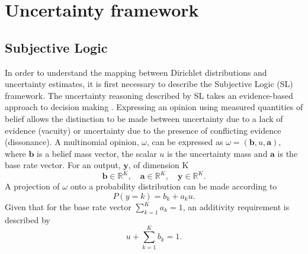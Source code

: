 \documentclass[
twocolumn,
]{ceurart}
\begin{document}
\section{Uncertainty framework}
\label{sec::unc_framework}

\subsection{Subjective Logic}
In order to understand the mapping between Dirichlet distributions and uncertainty estimates, it is first necessary to describe the Subjective Logic (SL) framework.
The uncertainty reasoning described by SL takes an evidence-based approach to decision making \cite{Josang2016}.
Expressing an opinion using measured quantities of belief allows the distinction to be made between uncertainty due to a lack of evidence (vacuity) or uncertainty due to the presence of conflicting evidence (dissonance).
A multinomial opinion, $\omega$, can be expressed as $\omega=\left(\mathbf{b}, u, \mathbf{a}\right)$, where $\mathbf{b}$ is a belief mass vector, the scalar $u$ is the uncertainty mass and $\mathbf{a}$ is the base rate vector.
For an output, $\mathbf{y}$, of dimension K
\begin{equation}
    \mathbf{b}\in\mathbb{R}^K,\quad\mathbf{a}\in\mathbb{R}^K,\quad\mathbf{y}\in\mathbb{R}^K.
\end{equation}
A projection of $\omega$ onto a probability distribution can be made according to
\begin{equation}
    P(y=k) = b_k + a_ku.
\label{eq:prob_projection}
\end{equation}
Given that for the base rate vector $\sum_{k=1}^Ka_k=1$, an additivity requirement is described by
\begin{equation}
    u+\sum_{k=1}^K b_k=1.
\end{equation}
\end{document}
